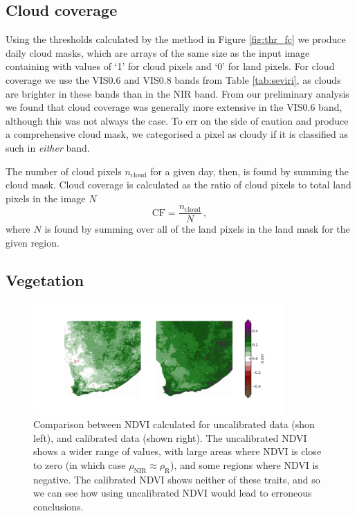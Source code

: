 \subsection{Cloud coverage}
Using the thresholds calculated by the method in Figure \ref{fig:thr_fc} we
produce daily cloud masks, which are arrays of the same size as the input image
containing with values of `1' for cloud pixels and `0' for land pixels. For
cloud coverage we use the VIS0.6 and VIS0.8 bands from Table \ref{tab:seviri},
as clouds are brighter in these bands than in the NIR band. From our preliminary
analysis we found that cloud coverage was generally more extensive in the VIS0.6
band, although this was not always the case. To err on the side of caution and
produce a comprehensive cloud mask, we categorised a pixel as cloudy if it is
classified as such in \emph{either} band.

The number of cloud pixels $n_{\mathrm{cloud}}$ for a given day, then, is found
by summing the cloud mask. Cloud coverage is calculated as the ratio of cloud
pixels to total land pixels in the image $N$
\begin{equation}
  \mathrm{CF} = \frac{n_{\mathrm{cloud}}}{N} \,,
  \label{eq:cloud_frac}
\end{equation}
where $N$ is found by summing over all of the land pixels in the land mask for
the given region.

\subsection{Vegetation}

\begin{figure}
  \centering
  \includegraphics[width=0.85\textwidth]{figures/ndvi_calibration_comparison.pdf}
  \caption{Comparison between NDVI calculated for uncalibrated data (shon left),
    and calibrated data (shown right). The uncalibrated NDVI shows a wider range
    of values, with large areas where NDVI is close to zero (in which case
    $\rho_{\textrm{NIR}}\approx\rho_{\textrm{R}}$), and some regions where NDVI is
    negative. The calibrated NDVI shows neither of these traits, and so we can
    see how using uncalibrated NDVI would lead to erroneous conclusions.}
  \label{fig:calibrationcomp}
\end{figure}

